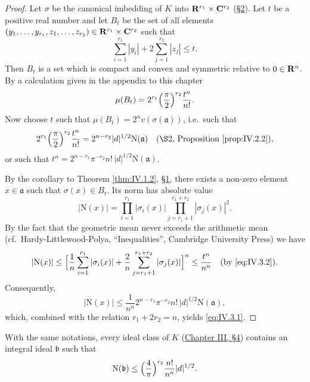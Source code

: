 \begin{proof}
Let $\sigma$ be the canonical imbedding of $K$ into
$\mathbf{R}^{r_{1}}\times\mathbf{C}^{r_{2}}$ (\hyperref[sec:4.2]{§2}). Let $t$ be a positive real number and let
$B_{t}$ be the set of all elements
$(y_{1},\ldots,y_{r_{1}},z_{1},\ldots,z_{r_{2}})\in
\mathbf{R}^{r_{1}}\times\mathbf{C}^{r_{2}}$ such that
\begin{equation}
\sum_{i=1}^{r_{1}}|y_{i}|+2\sum_{j=1}^{r_{2}}|z_{j}|\leq t.
\label{eq:IV.3.2}
\end{equation}
Then $B_{t}$ is a set which is compact and convex and symmetric relative to
$0\in\mathbf{R}^{n}$. By a calculation given in the appendix to this chapter
\begin{equation}
\mu(B_{t})=2^{r_{1}}\Bigl(\frac{\pi}{2}\Bigr)^{r_{2}}\frac{t^{n}}{n!}.
\label{eq:IV.3.3}
\end{equation}
Now choose $t$ such that
$\mu(B_{t})=2^{n}v(\sigma(\mathfrak{a}))$, i.e.\ such that
\[
2^{r_{1}}\Bigl(\frac{\pi}{2}\Bigr)^{r_{2}}\frac{t^{n}}{n!}
=2^{n-r_{2}}|d|^{1/2}\mathrm{N}(\mathfrak{a})
\quad(\text{\S2, Proposition \ref{prop:IV.2.2}}),
\]
or such that
$t^{n}=2^{n-r_{1}}\pi^{-r_{2}}n!\,|d|^{1/2}\mathrm{N}(\mathfrak{a})$.

By the corollary to Theorem \ref{thm:IV.1.2}, \hyperref[sec:4.1]{§1}, there exists a non-zero
element $x\in\mathfrak{a}$ such that $\sigma(x)\in B_{t}$. Its norm has
absolute value
\[
|\mathrm{N}(x)|=\prod_{i=1}^{r_{1}}|\sigma_{i}(x)|
\prod_{j=r_{1}+1}^{r_{1}+r_{2}}|\sigma_{j}(x)|^{2}.
\]
By the fact that the geometric mean never exceeds the arithmetic mean
(cf.\ Hardy-Littlewood-Polya, ``Inequalities'', Cambridge University Press)
we have
\[
|\mathrm{N}(x)|\leq\Bigl[\frac{1}{n}\sum_{i=1}^{r_{1}}|\sigma_{i}(x)|
+\frac{2}{n}\sum_{j=r_{1}+1}^{r_{1}+r_{2}}|\sigma_{j}(x)|\Bigr]^{n}
\leq\frac{t^{n}}{n^{n}}\quad(\text{by \eqref{eq:IV.3.2}}).
\]
Consequently,
\[
|\mathrm{N}(x)|\leq\frac{1}{n^{n}}2^{n-r_{1}}\pi^{-r_{2}}n!\,|d|^{1/2}
\mathrm{N}(\mathfrak{a}),
\]
which, combined with the relation $r_{1}+2r_{2}=n$, yields
\eqref{eq:IV.3.1}.
\end{proof}

\begin{corollary}
\label{cor:IV.3.1}
With the same notations, every ideal class of $K$ (\hyperref[sec:3.4]{Chapter III, §4})
contains an integral ideal $\mathfrak{b}$ such that
\begin{equation}
\mathrm{N}(\mathfrak{b})\leq\Bigl(\frac{4}{\pi}\Bigr)^{r_{2}}\frac{n!}{n^{n}}
|d|^{1/2}.
\label{eq:IV.3.4}
\end{equation}
\end{corollary}

